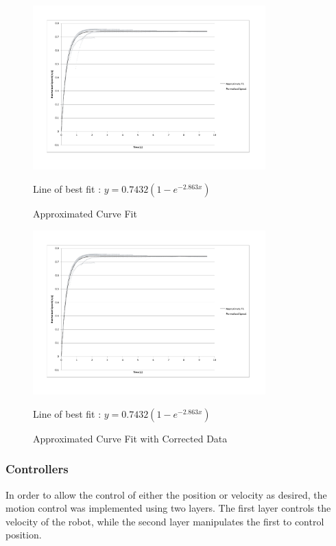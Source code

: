 \documentclass[10pt]{article}
\begin{document}
\begin{figure}
 \centering
 \includegraphics[width=0.8\textwidth]{Images/approximate-fit-model}
 \caption{Approximated Curve Fit}
 \label{fig:approximateFit}

 Line of best fit : $y=0.7432 \left(1-e^{-2.863x}\right)$
\end{figure}

\begin{figure}
 \centering
 \includegraphics[width=0.8\textwidth]{Images/approximate-fit-model-time-shift}
 \caption{Approximated Curve Fit with Corrected Data}
 \label{fig:approximateFitTimeShiftRemoved}

 Line of best fit : $y=0.7432 \left(1-e^{-2.863x}\right)$
\end{figure}

\subsubsection{Controllers}

In order to allow the control of either the position or velocity as desired, the
motion control was implemented using two layers.  The first layer controls the
velocity of the robot, while the second layer manipulates the first to control
position.
\end{document}
